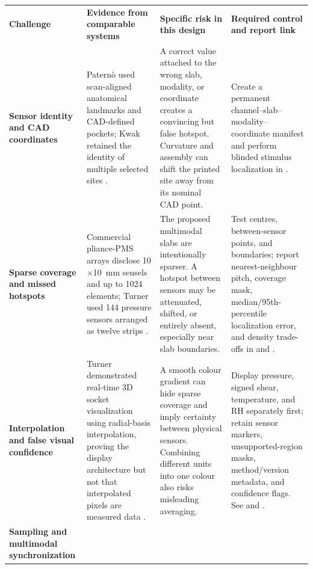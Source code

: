 \begingroup
\fontsize{7.22}{8.43}\selectfont
\setlength{\tabcolsep}{2.2pt}\renewcommand{\arraystretch}{1.05}
\begin{tabularx}{\linewidth}{>{\raggedright\arraybackslash\bfseries\color{AUBRed}}p{2.35cm}Y Y Y}
\color{white}\textbf{Challenge} &
\color{white}\textbf{Evidence from comparable systems} &
\color{white}\textbf{Specific risk in this design} &
\color{white}\textbf{Required control and report link} \\
Sensor identity and CAD coordinates &
Patern\`o used scan-aligned anatomical landmarks and CAD-defined pockets;
Kwak retained the identity of multiple selected sites
\cite{paterno2020,q3kwak2020}. &
A correct value attached to the wrong slab, modality, or coordinate creates a
convincing but false hotspot. Curvature and assembly can shift the printed site
away from its nominal CAD point. &
Create a permanent channel--slab--modality--coordinate manifest and perform
blinded stimulus localization in
. \\
Sparse coverage and missed hotspots &
Commercial pliance-PMS arrays disclose 10$\times$10~mm sensels and up to 1024
elements; Turner used 144 pressure sensors arranged as twelve strips
\cite{novelpliance2019,q3turner2021}. &
The proposed multimodal slabs are intentionally sparser. A hotspot between
sensors may be attenuated, shifted, or entirely absent, especially near slab
boundaries. &
Test centres, between-sensor points, and boundaries; report nearest-neighbour
pitch, coverage mask, median/95th-percentile localization error, and density
trade-offs in  and
. \\
Interpolation and false visual confidence &
Turner demonstrated real-time 3D socket visualization using radial-basis
interpolation, proving the display architecture but not that interpolated
pixels are measured data \cite{q3turner2021}. &
A smooth colour gradient can hide sparse coverage and imply certainty between
physical sensors. Combining different units into one colour also risks
misleading averaging. &
Display pressure, signed shear, temperature, and RH separately first; retain
sensor markers, unsupported-region masks, method/version metadata, and
confidence flags. See  and
. \\
Sampling and multimodal synchronization &

\end{tabularx}
